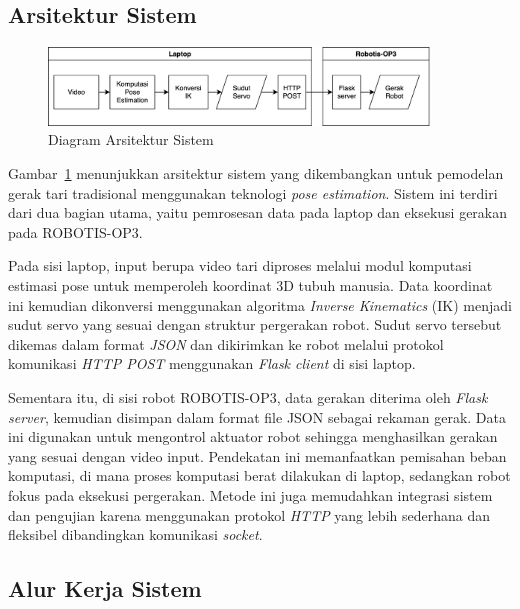 \subsection{Arsitektur Sistem}

\begin{figure}[H]
    \centering
    \includegraphics[width=0.9\textwidth]{images/arsitektur_sistem.png}
    \caption{Diagram Arsitektur Sistem}
    \label{fig:arsitektur_sistem}
\end{figure}

Gambar~\ref{fig:arsitektur_sistem} menunjukkan arsitektur sistem yang dikembangkan untuk pemodelan gerak tari tradisional menggunakan teknologi \textit{pose estimation}. Sistem ini terdiri dari dua bagian utama, yaitu pemrosesan data pada laptop dan eksekusi gerakan pada ROBOTIS-OP3.

Pada sisi laptop, input berupa video tari diproses melalui modul komputasi estimasi pose untuk memperoleh koordinat 3D tubuh manusia. Data koordinat ini kemudian dikonversi menggunakan algoritma \textit{Inverse Kinematics} (IK) menjadi sudut servo yang sesuai dengan struktur pergerakan robot. Sudut servo tersebut dikemas dalam format \textit{JSON} dan dikirimkan ke robot melalui protokol komunikasi \textit{HTTP POST} menggunakan \textit{Flask client} di sisi laptop.

Sementara itu, di sisi robot ROBOTIS-OP3, data gerakan diterima oleh \textit{Flask server}, kemudian disimpan dalam format file JSON sebagai rekaman gerak. Data ini digunakan untuk mengontrol aktuator robot sehingga menghasilkan gerakan yang sesuai dengan video input. Pendekatan ini memanfaatkan pemisahan beban komputasi, di mana proses komputasi berat dilakukan di laptop, sedangkan robot fokus pada eksekusi pergerakan. Metode ini juga memudahkan integrasi sistem dan pengujian karena menggunakan protokol \textit{HTTP} yang lebih sederhana dan fleksibel dibandingkan komunikasi \textit{socket}.



\subsection{Alur Kerja Sistem}

